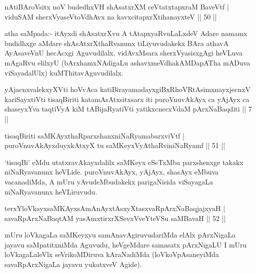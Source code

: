 \begin{shl}
nAtiBAroV\s sitx noV budedhxVH shAsatxrXM ceVtatxtapxraM BaveVtf |\\
viduSAM sherxVyaseV\s toV\s dhAvx na kavxcitapxrXtihanayxteV \hfill || 50 ||
\end{shl}

\begin{artha}
atha saMpada:- itAyxdi shAsatxrXvu A tAtapxyaRvuLaLxdeV Adare namamx budidhxge  aMdare shAsAtxrXthaRvanunx tiLiyuvudakekx BAra athavA AyAsaveVnU hecAcxgi Aguvudilalx, vidAvxMsara sherxVyasisxgAgi heVLuva mAgaRvu elilxyU (bArxhamxNAdigaLu ashavxmeVdhakAMDapATha mADuva viSayadalUlx) kuMThitavAguvudilalx.
\end{artha}


\begin{kandikeshl}
yAjacnxvalekxyXVti hoVvAca katiBirayamadayxgiBxRhoVRtAsimxnayxjecnxV kariSayxtiVti tisaqBiriti katamAsAtxsitxsarx iti puroVnuvAkAyx ca yAjAyx ca shaseyxYva taqtiVyA kiM tABijaRyatiVti yatikxcnecxVdaM pArxNaBaqditi || 7 ||
\end{kandikeshl}


\begin{shl}
tisaqBiriti saMKAyxthaRparxshanxniNaRyamabarxviVtf |\\
puroVnuvAkAyxduyxkAtxyX tu saMKeyxVyAthaRviniNaRyamf \hfill || 51 ||
\end{shl}

\begin{artha}
`tisaqBi' eMdu utatxravAkayxdalilx saMKeyx eSeTxMba parxshenxge takakx niNaRyavanunx heVLide. puroVnuvAkAyx, yAjAyx, shasAyx eMbuva vacanadiMda, A mUru yAvudeMbudakekx parigaNisida viSayagaLa niNaRyavanunx heVLiruvudu.
\end{artha}

\begin{shl}
terxYloVkayxsaMKAyxsAmAnAyxtAsxyXtasxvaRpArxNaBaqjajxyaH |\\
savaRpArxNaBaqtAM yasAmxtirxrXSevxVveYteVSu saMBavaH \hfill || 52 ||
\end{shl}

\begin{artha}
mUru loVkagaLa saMKeyxyu samAnavAgiruvudariMda elAlx pArxNigaLa  jayavu saMpatitxniMda Aguvudu, heVgeMdare samasatx pArxNigaLU I mUru loVkagaLaleVlx seVrikoMDiruva kAraNadiMda (loVkoVpAsaneyiMda savaRpArxNigaLa jayavu yukatxveV Agide).
\end{artha}

